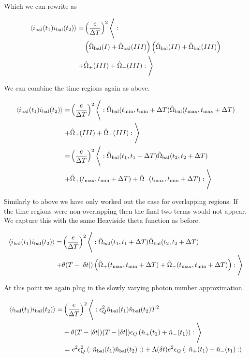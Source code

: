 \documentclass[12pt]{article}
\newcommand{\ep}{\epsilon}
\begin{document}
Which we can rewrite as

\begin{align}
\Braket{i_{\text{bal}}(t_1)i_{\text{bal}}(t_2)} =& \left(\frac{e}{\Delta T}\right)^2 \Bigg \langle:\\
&\left(\hat{\Omega}_{\text{bal}}(I) + \hat{\Omega}_{\text{bal}}(III) \right)\left(\hat{\Omega}_{\text{bal}}(II) + \hat{\Omega}_{\text{bal}}(III)  \right)\\
+&\hat{\Omega}_+(III) + \hat{\Omega}_-(III)
:\Bigg \rangle
\end{align}

We can combine the time regions again as above.

\begin{align}
\Braket{i_{\text{bal}}(t_1)i_{\text{bal}}(t_2)} =& \left(\frac{e}{\Delta T}\right)^2 \Bigg \langle: \hat{\Omega}_{\text{bal}}(t_{\text{min}},t_{\text{min}}+\Delta T) \hat{\Omega}_{\text{bal}}(t_{\text{max}},t_{\text{max}}+\Delta T) \\
+&\hat{\Omega}_+(III) + \hat{\Omega}_-(III)
:\Bigg \rangle\\
=& \left(\frac{e}{\Delta T}\right)^2 \Bigg \langle: \hat{\Omega}_{\text{bal}}(t_1,t_1+\Delta T) \hat{\Omega}_{\text{bal}}(t_2,t_2+\Delta T) \\
+&\hat{\Omega}_+(t_{\text{max}},t_{\text{min}}+\Delta T) + \hat{\Omega}_-(t_{\text{max}},t_{\text{min}}+\Delta T)
:\Bigg \rangle
\end{align}

Similarly to above we have only worked out the case for overlapping regions. If the time regions were non-overlapping then the final two terms would not appear. We capture this with the same Heaviside theta function as before.

\begin{align}
\Braket{i_{\text{bal}}(t_1)i_{\text{bal}}(t_2)} =& 
\left(\frac{e}{\Delta T}\right)^2 \Bigg \langle: \hat{\Omega}_{\text{bal}}(t_1,t_1+\Delta T) \hat{\Omega}_{\text{bal}}(t_2,t_2+\Delta T) \\
+&\theta(T-|\delta t|)\left(\hat{\Omega}_+(t_{\text{max}},t_{\text{min}}+\Delta T) + \hat{\Omega}_-(t_{\text{max}},t_{\text{min}}+\Delta T)\right)
:\Bigg \rangle
\end{align}

At this point we again plug in the slowly varying photon number approximation.

\begin{align}
\Braket{i_{\text{bal}}(t_1)i_{\text{bal}}(t_2)} = &\left(\frac{e}{\Delta T}\right)^2 \Bigg \langle: \ep_Q^2 \hat{n}_{\text{bal}}(t_1) \hat{n}_{\text{bal}}(t_2) T^2\\
&+\theta(T-|\delta t|)(T-|\delta t|)\ep_Q\left( \hat{n}_+(t_1) + \hat{n}_-(t_1)\right) :\Bigg \rangle\\
&=  e^2\ep_Q^2 \Braket{:\hat{n}_{\text{bal}}(t_1) \hat{n}_{\text{bal}}(t_2) :} + \Lambda(\delta t)e^2\ep_Q \Braket{: \hat{n}_+(t_1) + \hat{n}_-(t_1):}\\
\end{align}
\end{document}
